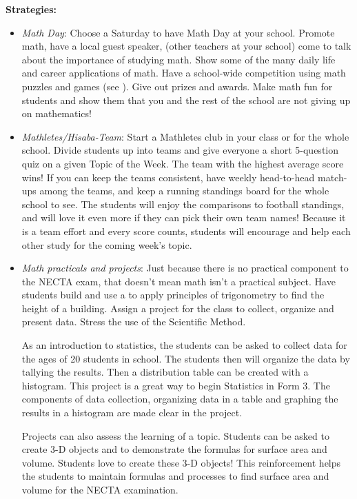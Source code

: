 \textbf{Strategies:}
\begin{itemize}
\item\emph{Math Day}: Choose a Saturday to have Math Day at your school. Promote math, have a local guest speaker, (other teachers at your school) come to talk about the importance of studying math. Show some of the many daily life and career applications of math. Have a school-wide competition using math puzzles and games (see ). Give out prizes and awards. Make math fun for students and show them that you and the rest of the school are not giving up on mathematics!

\item\emph{Mathletes\slash Hisaba-Team}: Start a Mathletes  club in your class or for the whole school. Divide students up into teams and give everyone a short 5-question quiz on a given Topic of the Week. The team with the highest average score wins! If you can keep the teams consistent, have weekly head-to-head match-ups among the teams, and keep a running standings board for the whole school to see. The students will enjoy the comparisons to football standings, and will love it even more if they can pick their own team names! Because it is a team effort and every score counts, students will encourage and help each other study for the coming week's topic.

\item\emph{Math practicals and projects}: Just because there is no practical component to the NECTA exam, that doesn't mean math isn't a practical subject. Have students build and use a  to apply principles of trigonometry to find the height of a building. Assign a  project for the class to collect, organize and present data. Stress the use of the Scientific Method.

As an introduction to statistics, the students can be asked to collect data for the ages of 20 students in school. The students then will organize the data by tallying the results. Then a distribution table can be created with a histogram. This project is a great way to begin Statistics in Form 3. The components of data collection, organizing data in a table and graphing the results in a histogram are made clear in the project.

Projects can also assess the learning of a topic. Students can be asked to create 3-D objects and to demonstrate the formulas for surface area and volume. Students love to create these 3-D objects! This reinforcement helps the students to maintain formulas and processes to find surface area and volume for the NECTA examination.


\end{itemize}
